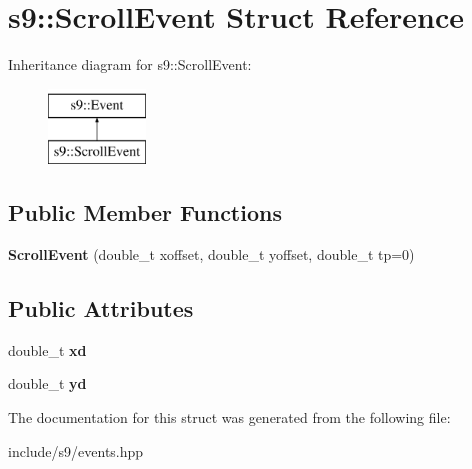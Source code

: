 \hypertarget{structs9_1_1ScrollEvent}{\section{s9\-:\-:\-Scroll\-Event \-Struct \-Reference}
\label{structs9_1_1ScrollEvent}
}
\-Inheritance diagram for s9\-:\-:\-Scroll\-Event\-:\begin{figure}[H]
\begin{center}
\leavevmode
\includegraphics[height=2.000000cm]{structs9_1_1ScrollEvent}
\end{center}
\end{figure}
\subsection*{\-Public \-Member \-Functions}
\begin{DoxyCompactItemize}
\item 
\hypertarget{structs9_1_1ScrollEvent_ae2ff405583c9c4075f527e808010ba1d}{{\bfseries \-Scroll\-Event} (double\-\_\-t xoffset, double\-\_\-t yoffset, double\-\_\-t tp=0)}\label{structs9_1_1ScrollEvent_ae2ff405583c9c4075f527e808010ba1d}

\end{DoxyCompactItemize}
\subsection*{\-Public \-Attributes}
\begin{DoxyCompactItemize}
\item 
\hypertarget{structs9_1_1ScrollEvent_a80ecdcca53e776f2314cfdf903a40af7}{double\-\_\-t {\bfseries xd}}\label{structs9_1_1ScrollEvent_a80ecdcca53e776f2314cfdf903a40af7}

\item 
\hypertarget{structs9_1_1ScrollEvent_aadd801ed8c3da29c8504c63953cb7b9f}{double\-\_\-t {\bfseries yd}}\label{structs9_1_1ScrollEvent_aadd801ed8c3da29c8504c63953cb7b9f}

\end{DoxyCompactItemize}


\-The documentation for this struct was generated from the following file\-:\begin{DoxyCompactItemize}
\item 
include/s9/events.\-hpp\end{DoxyCompactItemize}
